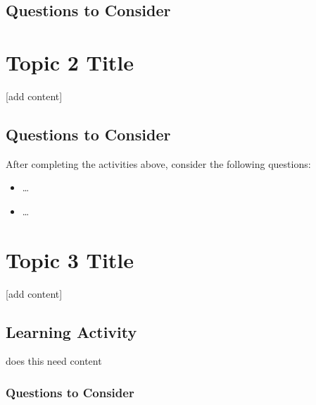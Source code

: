 \documentclass[
]{book}
\providecommand{\tightlist}{%
  \setlength{\itemsep}{0pt}\setlength{\parskip}{0pt}}
\begin{document}
\hypertarget{questions-to-consider-1}{%
\subsection*{Questions to Consider}\label{questions-to-consider-1}}

\hypertarget{topic-2-title}{%
\section{Topic 2 Title}\label{topic-2-title}}

{[}add content{]}

\hypertarget{questions-to-consider-2}{%
\subsection*{Questions to Consider}\label{questions-to-consider-2}}

After completing the activities above, consider the following questions:

\begin{itemize}
\tightlist
\item
  \ldots{}\\
\item
  \ldots{}
\end{itemize}

\hypertarget{topic-3-title}{%
\section{Topic 3 Title}\label{topic-3-title}}

{[}add content{]}

\hypertarget{learning-activity}{%
\subsection*{Learning Activity}\label{learning-activity}}

\begin{reflect}
does this need content
\end{reflect}

\hypertarget{questions-to-consider-3}{%
\subsubsection*{Questions to Consider}\label{questions-to-consider-3}}
\end{document}
